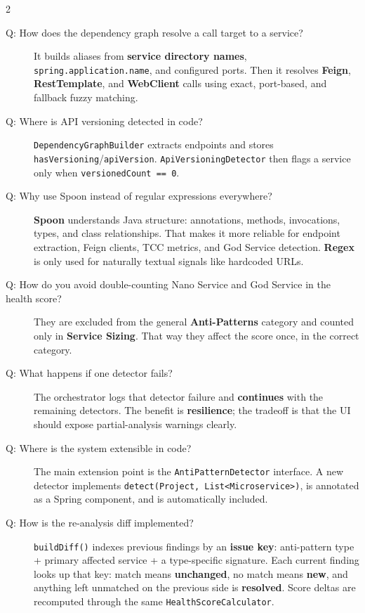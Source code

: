 \documentclass[10pt,a4paper]{article}
\begin{document}
\begin{multicols}{2}
\begin{description}
    \item[Q: How does the dependency graph resolve a call target to a service?]
    It builds aliases from \textbf{service directory names}, \texttt{spring.application.name}, and configured ports. Then it resolves \textbf{Feign}, \textbf{RestTemplate}, and \textbf{WebClient} calls using exact, port-based, and fallback fuzzy matching.

    \item[Q: Where is API versioning detected in code?]
    \texttt{DependencyGraphBuilder} extracts endpoints and stores \texttt{hasVersioning}/\texttt{apiVersion}. \texttt{ApiVersioningDetector} then flags a service only when \texttt{versionedCount == 0}.

    \item[Q: Why use Spoon instead of regular expressions everywhere?]
    \textbf{Spoon} understands Java structure: annotations, methods, invocations, types, and class relationships. That makes it more reliable for endpoint extraction, Feign clients, TCC metrics, and God Service detection. \textbf{Regex} is only used for naturally textual signals like hardcoded URLs.

    \item[Q: How do you avoid double-counting Nano Service and God Service in the health score?]
    They are excluded from the general \textbf{Anti-Patterns} category and counted only in \textbf{Service Sizing}. That way they affect the score once, in the correct category.

    \item[Q: What happens if one detector fails?]
    The orchestrator logs that detector failure and \textbf{continues} with the remaining detectors. The benefit is \textbf{resilience}; the tradeoff is that the UI should expose partial-analysis warnings clearly.

    \item[Q: Where is the system extensible in code?]
    The main extension point is the \texttt{AntiPatternDetector} interface. A new detector implements \texttt{detect(Project, List<Microservice>)}, is annotated as a Spring component, and is automatically included.

    \item[Q: How is the re-analysis diff implemented?]
    \texttt{buildDiff()} indexes previous findings by an \textbf{issue key}: anti-pattern type + primary affected service + a type-specific signature. Each current finding looks up that key: match means \textbf{unchanged}, no match means \textbf{new}, and anything left unmatched on the previous side is \textbf{resolved}. Score deltas are recomputed through the same \texttt{HealthScoreCalculator}.


\end{description}
\end{multicols}
\end{document}
